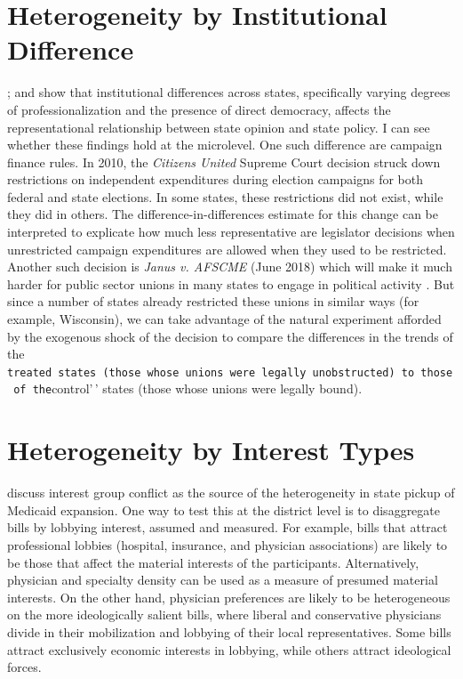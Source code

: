 \documentclass[
  oneside]{book}
\begin{document}
\hypertarget{heterogeneity-by-institutional-difference}{%
\section{Heterogeneity by Institutional Difference}\label{heterogeneity-by-institutional-difference}}

\citet{Lax:2009}; \citet{Lax:2012} and \citet{Lewis:2017} show that institutional differences across states, specifically varying degrees of professionalization and the presence of direct democracy, affects the representational relationship between state opinion and state policy. I can see whether these findings hold at the microlevel. One such difference are campaign finance rules. In 2010, the \emph{Citizens United} Supreme Court decision struck down restrictions on independent expenditures during election campaigns for both federal and state elections. In some states, these restrictions did not exist, while they did in others. The difference-in-differences estimate for this change can be interpreted to explicate how much less representative are legislator decisions when unrestricted campaign expenditures are allowed when they used to be restricted. Another such decision is \emph{Janus v. AFSCME} (June 2018) which will make it much harder for public sector unions in many states to engage in political activity \citep{Feigenbaum:2018}. But since a number of states already restricted these unions in similar ways (for example, Wisconsin), we can take advantage of the natural experiment afforded by the exogenous shock of the decision to compare the differences in the trends of the \texttt{treated\textquotesingle{}\textquotesingle{}\ states\ (those\ whose\ unions\ were\ legally\ unobstructed)\ to\ those\ of\ the}control'\,' states (those whose unions were legally bound).

\hypertarget{heterogeneity-by-interest-types}{%
\section{Heterogeneity by Interest Types}\label{heterogeneity-by-interest-types}}

\citet{Hertel-Fernandez:2016} discuss interest group conflict as the source of the heterogeneity in state pickup of Medicaid expansion. One way to test this at the district level is to disaggregate bills by lobbying interest, assumed and measured. For example, bills that attract professional lobbies (hospital, insurance, and physician associations) are likely to be those that affect the material interests of the participants. Alternatively, physician and specialty density can be used as a measure of presumed material interests. On the other hand, physician preferences are likely to be heterogeneous on the more ideologically salient bills, where liberal and conservative physicians divide in their mobilization and lobbying of their local representatives. Some bills attract exclusively economic interests in lobbying, while others attract ideological forces.
\end{document}
